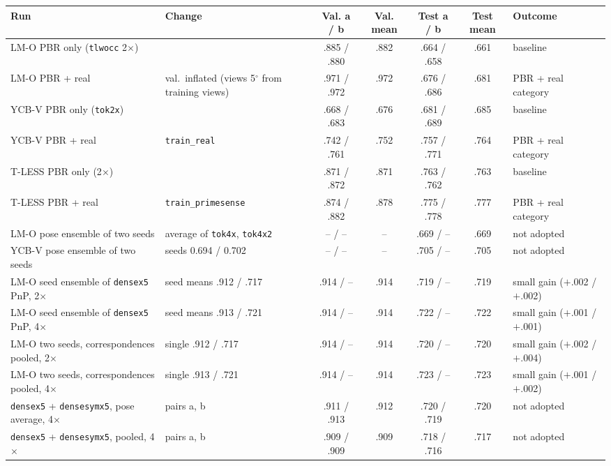 \begin{table}[t]
  \centering
  \small
  \begin{tabular}{@{}llccccl@{}}
    \toprule
    Run & Change & Val. a / b & Val. mean & Test a / b & Test mean & Outcome \\
    \midrule
    LM-O PBR only (\texttt{tlwocc} 2$\times$) &  & .885 / .880 & .882 & .664 / .658 & .661 & baseline \\
    LM-O PBR + real & val.\ inflated (views 5$^\circ$ from training views) & .971 / .972 & .972 & .676 / .686 & .681 & PBR + real category \\
    YCB-V PBR only (\texttt{tok2x}) &  & .668 / .683 & .676 & .681 / .689 & .685 & baseline \\
    YCB-V PBR + real & \texttt{train\_real} & .742 / .761 & .752 & .757 / .771 & .764 & PBR + real category \\
    T-LESS PBR only (2$\times$) &  & .871 / .872 & .871 & .763 / .762 & .763 & baseline \\
    T-LESS PBR + real & \texttt{train\_primesense} & .874 / .882 & .878 & .775 / .778 & .777 & PBR + real category \\
    LM-O pose ensemble of two seeds & average of \texttt{tok4x}, \texttt{tok4x2} & -- / -- & -- & .669 / -- & .669 & not adopted \\
    YCB-V pose ensemble of two seeds & seeds 0.694 / 0.702 & -- / -- & -- & .705 / -- & .705 & not adopted \\
    LM-O seed ensemble of \texttt{densex5} PnP, 2$\times$ & seed means .912 / .717 & .914 / -- & .914 & .719 / -- & .719 & small gain ($+$.002 / $+$.002) \\
    LM-O seed ensemble of \texttt{densex5} PnP, 4$\times$ & seed means .913 / .721 & .914 / -- & .914 & .722 / -- & .722 & small gain ($+$.001 / $+$.001) \\
    LM-O two seeds, correspondences pooled, 2$\times$ & single .912 / .717 & .914 / -- & .914 & .720 / -- & .720 & small gain ($+$.002 / $+$.004) \\
    LM-O two seeds, correspondences pooled, 4$\times$ & single .913 / .721 & .914 / -- & .914 & .723 / -- & .723 & small gain ($+$.001 / $+$.002) \\
    \texttt{densex5} + \texttt{densesymx5}, pose average, 4$\times$ & pairs a, b & .911 / .913 & .912 & .720 / .719 & .720 & not adopted \\
    \texttt{densex5} + \texttt{densesymx5}, pooled, 4$\times$ & pairs a, b & .909 / .909 & .909 & .718 / .716 & .717 & not adopted \\

\end{tabular}
\end{table}
